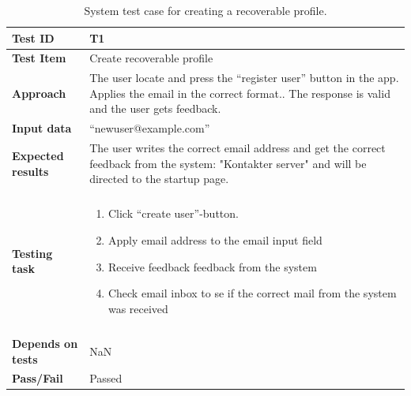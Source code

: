 \begin{appendices}
\begin{table}[H]
	\small
	\centering
	\caption{System test case for creating a recoverable profile.}
	\begin{tabular}[b]{ | l | l  |}
			\hline
			\textbf{Test ID} & T1  \\ \hline
			\textbf{Test Item} & Create recoverable profile \\ \hline
			\textbf{Approach} & \begin{minipage}{5in}The user locate and press the “register user” button in the app. Applies the email in the correct format.. The response is valid and the user gets feedback. \end{minipage}\\ \hline
			\textbf{Input data} &  “newuser@example.com”\\ \hline
			
			\textbf{Expected results} & \begin{minipage}{5in}The user writes the correct email address and get the correct feedback from the system: "Kontakter server" and will be directed to the startup page.\end{minipage}\\ \hline&\\[-3.8ex]
		
			\textbf{Testing task} & \begin{minipage}{5in}
			\begin{enumerate}[noitemsep]
			\item Click  “create user”-button.
			\item Apply email address to the email input field 
			\item Receive feedback feedback from the system
			\item Check email inbox to se if the correct mail from the system was received 
			 \end{enumerate} \end{minipage}
			\\&\\[-3.8ex] \hline
			\textbf{Depends on tests}& NaN \\ \hline	
			\textbf{Pass/Fail} & Passed \\\hline				
		\end{tabular}
	\label{Tab:systemTesting1}
\end{table}



\end{appendices}

